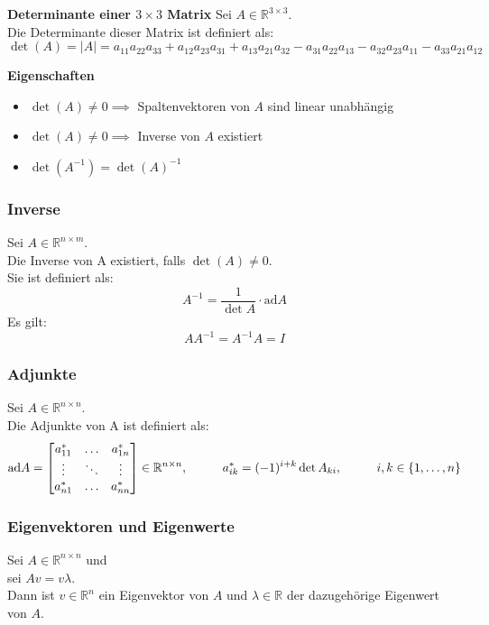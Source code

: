 \documentclass[10pt,a4paper]{article}
\newcommand{\tab}[1][1]{\hspace*{#1cm}}
\begin{document}
\textbf{Determinante einer $3 \times 3$ Matrix}
Sei $A \in \mathbb{R}^{3 \times 3}$. \\
Die Determinante dieser Matrix ist definiert als:
$$
	\det(A) = |A| = a_{11}a_{22}a_{33} + a_{12}a_{23}a_{31} + a_{13}a_{21}a_{32} - a_{31}a_{22}a_{13} - a_{32}a_{23}a_{11} - a_{33}a_{21}a_{12}
$$

\textbf{Eigenschaften}
\begin{itemize}
	\item $\det(A) ≠ 0 \implies$ Spaltenvektoren von $A$ sind linear unabhängig
	\item $\det(A) ≠ 0 \implies$ Inverse von $A$ existiert
	\item $\det(A^{-1}) = \det(A)^{-1}$
\end{itemize}

\subsubsection{Inverse}
Sei $A \in \mathbb{R}^{n \times m}$. \\
Die Inverse von A existiert, falls $\det(A) ≠ 0$. \\
Sie ist definiert als:
$$
	A^{-1} = \frac{1}{\det A} ⋅ \textrm{ad}A
$$
Es gilt:
$$
	AA^{-1} = A^{-1}A = I
$$

\subsubsection{Adjunkte}
Sei $A \in \mathbb{R}^{n \times n}$. \\
Die Adjunkte von A ist definiert als:
$$
	\textrm{ad} A  = \begin{bmatrix}
	a^*_{11} & \dots & a^*_{1n} \\
	\vdots & \ddots & \vdots \\
	a^*_{n1} & \dots & a^*_{nn}
	\end{bmatrix} \in \mathbb{R}^{n \times n}, \tab a^*_{ik} = (-1)^{i + k} \det A_{ki}, \tab i,k \in \{1, \dots, n\}
$$

\subsubsection{Eigenvektoren und Eigenwerte}
Sei $A \in \mathbb{R}^{n \times n}$ und \\
sei $Av = v\lambda$. \\
Dann ist $v \in \mathbb{R}^n$ ein Eigenvektor von $A$ und $\lambda \in \mathbb{R}$ der dazugehörige Eigenwert von $A$. \\
\end{document}
